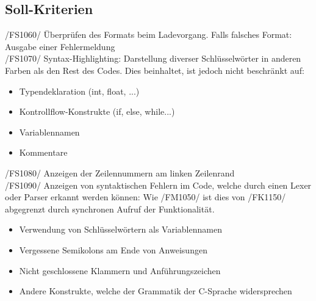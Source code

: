\documentclass[a4paper]{scrreprt}
\begin{document}
\subsection{Soll-Kriterien}
/FS1060/ Überprüfen des Formats beim Ladevorgang. Falls falsches Format: Ausgabe einer Fehlermeldung \\
/FS1070/ Syntax-Highlighting: Darstellung diverser Schlüsselwörter in anderen Farben als den Rest des Codes. Dies beinhaltet, ist jedoch nicht beschränkt auf: 
\begin{itemize}
\item Typendeklaration (int, float, ...)
\item Kontrollflow-Konstrukte (if, else, while...)
\item Variablennamen
\item Kommentare
\end{itemize}
/FS1080/ Anzeigen der Zeilennummern am linken Zeilenrand \\
/FS1090/ Anzeigen von syntaktischen Fehlern im Code, welche durch einen Lexer oder Parser erkannt werden können: Wie /FM1050/ ist dies von /FK1150/ abgegrenzt durch synchronen Aufruf der Funktionalität.
\begin{itemize}
\item Verwendung von Schlüsselwörtern als Variablennamen 
\item Vergessene Semikolons am Ende von Anweisungen
\item Nicht geschlossene Klammern und Anführungszeichen
\item Andere Konstrukte, welche der Grammatik der C-Sprache widersprechen
\end{itemize}
\end{document}
